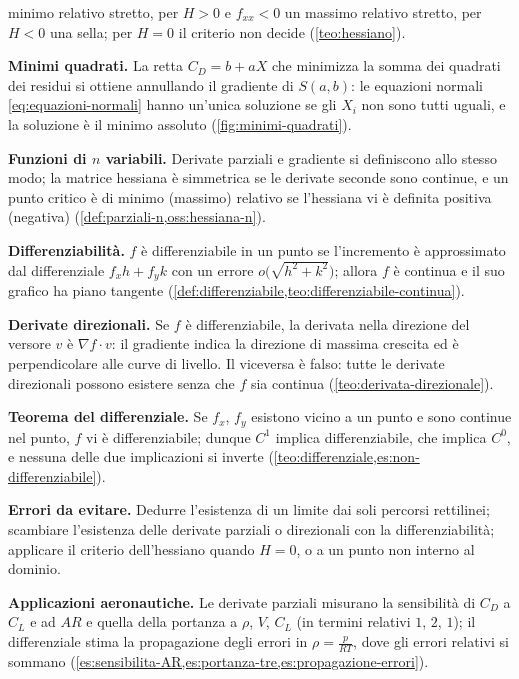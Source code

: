 \begin{puntichiave}
minimo relativo stretto, per $H>0$ e $f_{xx}<0$ un massimo relativo stretto, per $H<0$
una sella; per $H=0$ il criterio non decide (\cref{teo:hessiano}).
\item \textbf{Minimi quadrati.} La retta $C_{D}=b+aX$ che minimizza la somma dei
quadrati dei residui si ottiene annullando il gradiente di $S(a,b)$: le equazioni
normali \eqref{eq:equazioni-normali} hanno un'unica soluzione se gli $X_{i}$ non sono
tutti uguali, e la soluzione è il minimo assoluto (\cref{fig:minimi-quadrati}).
\item \textbf{Funzioni di $n$ variabili.} Derivate parziali e gradiente si definiscono
allo stesso modo; la matrice hessiana è simmetrica se le derivate seconde sono continue,
e un punto critico è di minimo (massimo) relativo se l'hessiana vi è definita
positiva (negativa) (\cref{def:parziali-n,oss:hessiana-n}).
\item \textbf{Differenziabilità.} $f$ è differenziabile in un punto se l'incremento è
approssimato dal differenziale $f_{x}h+f_{y}k$ con un errore $o\bigl(\sqrt{h^{2}+k^{2}}\bigr)$;
allora $f$ è continua e il suo grafico ha piano tangente
(\cref{def:differenziabile,teo:differenziabile-continua}).
\item \textbf{Derivate direzionali.} Se $f$ è differenziabile, la derivata nella
direzione del versore $v$ è $\nabla f\cdot v$: il gradiente indica la direzione di
massima crescita ed è perpendicolare alle curve di livello. Il viceversa è falso: tutte
le derivate direzionali possono esistere senza che $f$ sia continua
(\cref{teo:derivata-direzionale}).
\item \textbf{Teorema del differenziale.} Se $f_{x}$, $f_{y}$ esistono vicino a un
punto e sono continue nel punto, $f$ vi è differenziabile; dunque $C^{1}$ implica
differenziabile, che implica $C^{0}$, e nessuna delle due implicazioni si inverte
(\cref{teo:differenziale,es:non-differenziabile}).
\item \textbf{Errori da evitare.} Dedurre l'esistenza di un limite dai soli percorsi
rettilinei; scambiare l'esistenza delle derivate parziali o direzionali con la
differenziabilità; applicare il criterio dell'hessiano quando $H=0$, o a un punto non
interno al dominio.
\item \textbf{Applicazioni aeronautiche.} Le derivate parziali misurano la sensibilità
di $C_{D}$ a $C_{L}$ e ad $AR$ e quella della portanza a $\rho$, $V$, $C_{L}$ (in
termini relativi $1$, $2$, $1$); il differenziale stima la propagazione degli errori in
$\rho=\frac p{RT}$, dove gli errori relativi si sommano
(\cref{es:sensibilita-AR,es:portanza-tre,es:propagazione-errori}).
\end{puntichiave}

